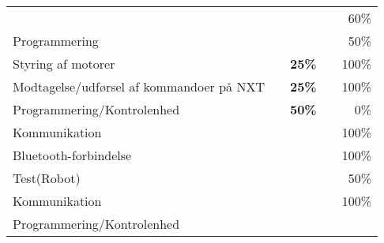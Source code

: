\begin{footnotesize}
\begin{center}
\begin{tabular}{l | l | r r r}
																&		&		& 		& 60\%\\
	\hspace*{0.3cm}\hspace*{0.3cm}\hspace*{0.3cm} Programmering
																&		&		& 		& 50\% \\
	\hspace*{0.3cm}\hspace*{0.3cm}\hspace*{0.3cm}\hspace*{0.3cm} Styring af motorer
																&		&\textbf{25\%}		& 		& 100\%\\
	\hspace*{0.3cm}\hspace*{0.3cm}\hspace*{0.3cm}\hspace*{0.3cm} Modtagelse/udførsel af kommandoer på NXT
																& 		&\textbf{25\%}		& 		& 100\%\\
	\hspace*{0.3cm}\hspace*{0.3cm}\hspace*{0.3cm}\hspace*{0.3cm} Programmering/Kontrolenhed
																&		&\textbf{50\%}		& 		& 0\%\\	
	\hspace*{0.3cm}\hspace*{0.3cm}\hspace*{0.3cm} Kommunikation
																&		&		& 		& 100\%\\
	\hspace*{0.3cm}\hspace*{0.3cm}\hspace*{0.3cm}\hspace*{0.3cm} Bluetooth-forbindelse
																&		&		& 		& 100\%\\
	\hspace*{0.3cm}\hspace*{0.3cm}\hspace*{0.3cm} Test(Robot)
																&		&		& 		& 50\%\\
	\hspace*{0.3cm}\hspace*{0.3cm}\hspace*{0.3cm}\hspace*{0.3cm} Kommunikation
																&		&		& 		& 100\%\\	
	\hspace*{0.3cm}\hspace*{0.3cm}\hspace*{0.3cm}\hspace*{0.3cm} Programmering/Kontrolenhed

\end{tabular}
\end{center}
\end{footnotesize}
